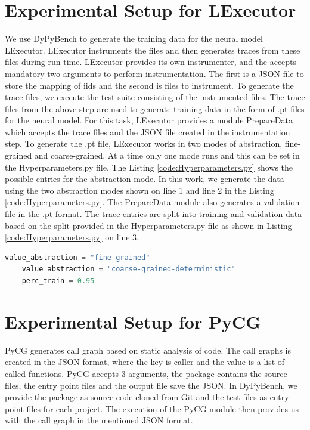 \section{Experimental Setup for LExecutor}
We use DyPyBench to generate the training data for the neural model LExecutor.
LExecutor instruments the files and then generates traces from these files during run-time.
LExecutor provides its own instrumenter, and the accepts mandatory two arguments to perform instrumentation.
The first is a JSON file to store the mapping of iids and the second is files to instrument.
To generate the trace files, we execute the test suite consisting of the instrumented files.
The trace files from the above step are used to generate training data in the form of .pt files for the neural model.
For this task, LExecutor provides a module PrepareData which accepts the trace files and the JSON file created in the instrumentation step.
To generate the .pt file, LExecutor works in two modes of abstraction, fine-grained and coarse-grained.
At a time only one mode runs and this can be set in the Hyperparameters.py file.
The Listing \ref{code:Hyperparameters.py} shows the possible entries for the abstraction mode.
In this work, we generate the data using the two abstraction modes shown on line 1 and line 2 in the Listing \ref{code:Hyperparameters.py}. 
The PrepareData module also generates a validation file in the .pt format.
The trace entries are split into training and validation data based on the split provided in the Hyperparameters.py file as shown in Listing \ref{code:Hyperparameters.py} on line 3.
\begin{lstlisting}[caption=Abstraction Modes in LExecutor,label=code:Hyperparameters.py,language=Python]
    value_abstraction = "fine-grained"
    value_abstraction = "coarse-grained-deterministic"
    perc_train = 0.95
\end{lstlisting}

\section{Experimental Setup for PyCG}
PyCG generates call graph based on static analysis of code.
The call graphs is created in the JSON format, where the key is caller and the value is a list of called functions.
PyCG accepts 3 arguments, the package contains the source files, the entry point files and the output file save the JSON.
In DyPyBench, we provide the package as source code cloned from Git and the test files as entry point files for each project.
The execution of the PyCG module then provides us with the call graph in the mentioned JSON format.

